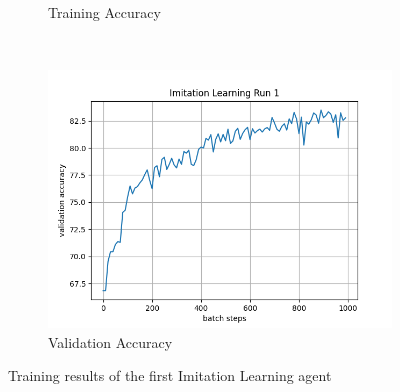 \documentclass[10pt]{scrartcl}
\begin{document}
\begin{figure}[h]
\begin{subfigure}{0.5\textwidth}
  \caption{Training Accuracy}
  \label{fig:Il1_train}
\end{subfigure} \\
\begin{subfigure}{0.5\textwidth}
  \centering
  \includegraphics[width=\linewidth]{images/Il1_valid.png}
  \caption{Validation Accuracy}
  \label{fig:Il1_valid}
\end{subfigure}
\caption{Training results of the first Imitation Learning agent}
\label{fig:Il1}
\end{figure}
\end{document}
